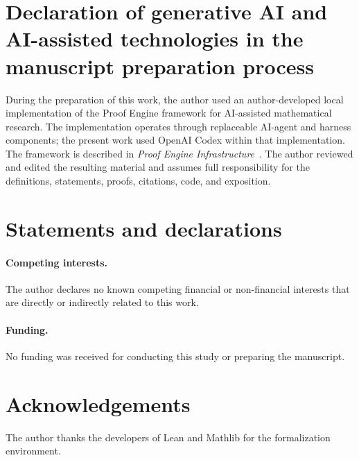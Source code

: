 \documentclass[11pt]{amsart}
\theoremstyle{definition}
\begin{document}
\section*{Declaration of generative AI and AI-assisted technologies in the
manuscript preparation process}

During the preparation of this work, the author used an author-developed local
implementation of the Proof Engine framework for AI-assisted mathematical
research.  The implementation operates through replaceable AI-agent and
harness components; the present work used OpenAI Codex within that
implementation.  The framework is described in \emph{Proof Engine
Infrastructure}~\cite{LiProofEngine2026}.  The author reviewed and edited the
resulting material and assumes full responsibility for the definitions,
statements, proofs, citations, code, and exposition.

\section*{Statements and declarations}

\paragraph{Competing interests.}
The author declares no known competing financial or non-financial interests
that are directly or indirectly related to this work.

\paragraph{Funding.}
No funding was received for conducting this study or preparing the manuscript.

\section*{Acknowledgements}

The author thanks the developers of Lean and Mathlib for the formalization
environment.



\end{document}
